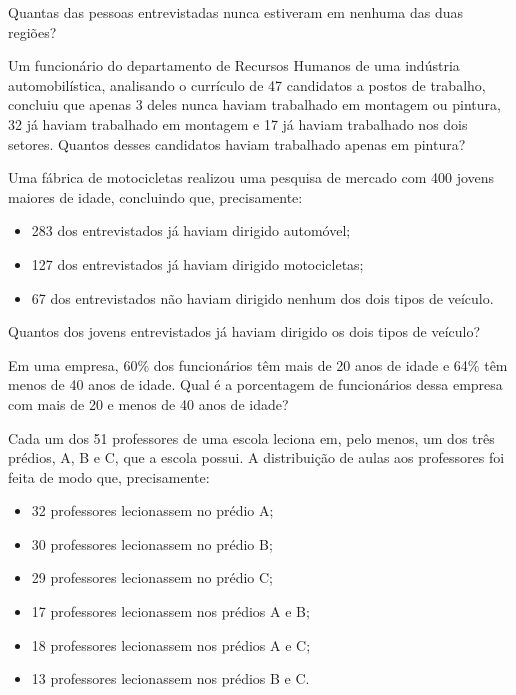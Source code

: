 \documentclass[10pt,a4paper]{article}
\begin{document}
\begin{multicols}{2}
\begin{question}[type=exam]
      Quantas das pessoas entrevistadas nunca estiveram em nenhuma das duas regiões?
    \end{question}

    \begin{question}[type=exam]
      Um funcionário do departamento de Recursos Humanos de uma indústria automobilística, analisando o currículo de 47 candidatos
      a postos de trabalho, concluiu que apenas 3 deles nunca haviam trabalhado em montagem ou pintura, 32 já haviam trabalhado em 
      montagem e 17 já haviam trabalhado nos dois setores. Quantos desses candidatos haviam trabalhado apenas em pintura?
    \end{question}

    \begin{question}[type=exam]
      Uma fábrica de motocicletas realizou uma pesquisa de mercado com 400 jovens maiores de idade, concluindo
      que, precisamente:
      \begin{itemize}
        \item 283 dos entrevistados já haviam dirigido automóvel;
        \item 127 dos entrevistados já haviam dirigido motocicletas;
        \item 67 dos entrevistados não haviam dirigido nenhum dos dois tipos de veículo. 
      \end{itemize}

      Quantos dos jovens entrevistados já haviam dirigido os dois tipos de veículo?
    \end{question}

    \begin{question}[type=exam]
      Em uma empresa, 60\% dos funcionários têm mais de 20 anos de idade e 64\% têm menos de 40 anos de idade. 
      Qual é a porcentagem de funcionários dessa empresa com mais de 20 e menos de 40 anos de idade?
    \end{question}

    \begin{question}[type=exam]
      Cada um dos 51 professores de uma escola leciona em, pelo menos, um dos três prédios, A, B e C, que a escola possui. 
      A distribuição de aulas aos professores foi feita de modo que, precisamente:
      \begin{itemize}
        \item 32 professores lecionassem no prédio A;
        \item 30 professores lecionassem no prédio B;
        \item 29 professores lecionassem no prédio C;
        \item 17 professores lecionassem nos prédios A e B;
        \item 18 professores lecionassem nos prédios A e C;
        \item 13 professores lecionassem nos prédios B e C. 
      \end{itemize}


\end{question}
\end{multicols}
\end{document}
